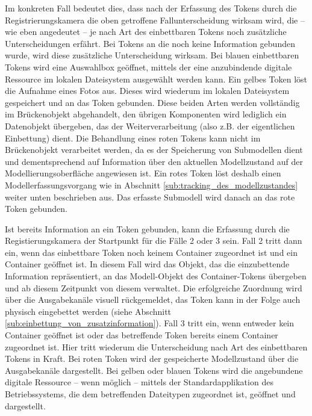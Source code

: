 Im konkreten Fall bedeutet dies, dass nach der Erfassung des Tokens durch die Registrierungskamera die oben getroffene Fallunterscheidung wirksam wird, die -- wie eben angedeutet -- je nach Art des einbettbaren Tokens noch zusätzliche Unterscheidungen erfährt. Bei Tokens an die noch keine Information gebunden wurde, wird diese zusätzliche Unterscheidung wirksam. Bei blauen einbettbaren Tokens wird eine Auswahlbox geöffnet, mittels der eine anzubindende digitale Ressource im lokalen Dateisystem ausgewählt werden kann. Ein gelbes Token löst die Aufnahme eines Fotos aus. Dieses wird wiederum im lokalen Dateisystem gespeichert und an das Token gebunden. Diese beiden Arten werden vollständig im Brückenobjekt abgehandelt, den übrigen Komponenten wird lediglich ein Datenobjekt übergeben, das der Weiterverarbeitung (also z.B. der eigentlichen Einbettung) dient. Die Behandlung eines roten Tokens kann nicht im Brückenobjekt verarbeitet werden, da es der Speicherung von Submodellen dient und dementsprechend auf Information über den aktuellen Modellzustand auf der Modellierungsoberfläche angewiesen ist. Ein rotes Token löst deshalb einen Modellerfassungsvorgang wie in Abschnitt \ref{sub:tracking_des_modellzustandes} weiter unten beschrieben aus. Das erfasste Submodell wird danach an das rote Token gebunden.

Ist bereits Information an ein Token gebunden, kann die Erfassung durch die Registierungskamera der Startpunkt für die Fälle 2 oder 3 sein. Fall 2 tritt dann ein, wenn das einbettbare Token noch keinem Container zugeordnet ist und ein Container geöffnet ist. In diesem Fall wird das Objekt, das die einzubettende Information repräsentiert, an das Modell-Objekt des Container-Tokens übergeben und ab diesem Zeitpunkt von diesem verwaltet. Die erfolgreiche Zuordnung wird über die Ausgabekanäle visuell rückgemeldet, das Token kann in der Folge auch physisch eingebettet werden (siehe Abschnitt \ref{sub:einbettung_von_zusatzinformation}). Fall 3 tritt ein, wenn entweder kein Container geöffnet ist oder das betreffende Token bereits einem Container zugeordnet ist. Hier tritt wiederum die Unterscheidung nach Art des einbettbaren Tokens in Kraft. Bei roten Token wird der gespeicherte Modellzustand über die Ausgabekanäle dargestellt. Bei gelben oder blauen Tokens wird die angebundene digitale Ressource -- wenn möglich -- mittels der Standardapplikation des Betriebssystems, die dem betreffenden Dateitypen zugeordnet ist, geöffnet und dargestellt.


